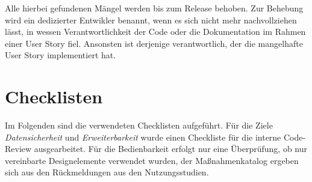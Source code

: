 Alle hierbei gefundenen Mängel werden bis zum Release behoben. Zur Behebung wird ein dedizierter Entwikler benannt, wenn es sich nicht mehr nachvollziehen lässt, in wessen Verantwortlichkeit der Code oder die Dokumentation im Rahmen einer User Story fiel. Ansonsten ist derjenige verantwortlich, der die mangelhafte User Story implementiert hat.

\section{Checklisten}

Im Folgenden sind die verwendeten Checklisten aufgeführt. Für die Ziele \emph{Datensicherheit} und \emph{Erweiterbarkeit} wurde einen Checkliste für die interne Code-Review ausgearbeitet. Für die Bedienbarkeit erfolgt nur eine Überprüfung, ob nur vereinbarte Designelemente verwendet wurden, der Maßnahmenkatalog ergeben sich aus den Rückmeldungen aus den Nutzungsstudien.

